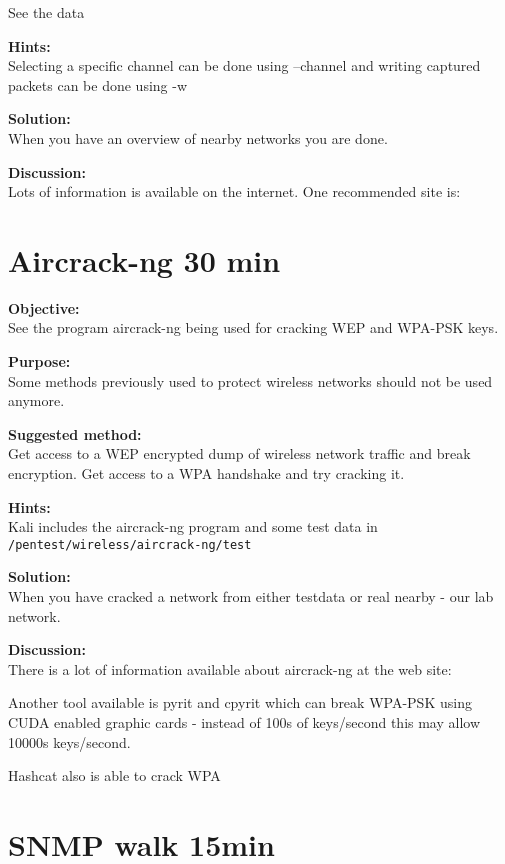 \documentclass[a4paper,11pt,notitlepage]{report}
\begin{document}
See the data

{\bf Hints:}\\
Selecting a specific channel can be done using --channel and writing captured packets can be done using -w

{\bf Solution:}\\
When you have an overview of nearby networks you are done.

{\bf Discussion:}\\

Lots of information is available on the internet. One recommended site is: 


\chapter{Aircrack-ng 30 min}
\label{ex:aircrack-ng}

{\bf Objective:}\\
See the program aircrack-ng being used for cracking WEP and WPA-PSK keys.

{\bf Purpose:}\\
Some methods previously used to protect wireless networks should not be used anymore.

{\bf Suggested method:}\\
Get access to a WEP encrypted dump of wireless network traffic and break encryption. Get access to a WPA handshake and try cracking it.


{\bf Hints:}\\
Kali includes the aircrack-ng program and some test data in \\
\verb+/pentest/wireless/aircrack-ng/test+

{\bf Solution:}\\
When you have cracked a network from either testdata or real nearby - our lab network.

{\bf Discussion:}\\
There is a lot of information available about aircrack-ng at the web site:\\

Another tool available is pyrit and cpyrit which can break WPA-PSK using CUDA enabled graphic cards - instead of 100s of keys/second this may allow 10000s keys/second.

Hashcat also is able to crack WPA 



\chapter{SNMP walk 15min}
\label{ex:snmpwalk}
\end{document}
